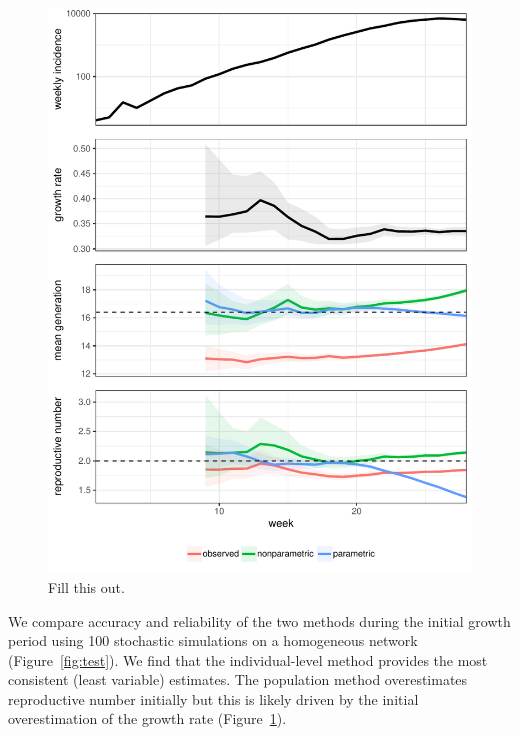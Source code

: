 \documentclass[12pt]{article}
\begin{document}
\begin{figure}
\includegraphics[width=\textwidth]{../fig/example.pdf}
\caption{Fill this out.}
\label{fig:example}
\end{figure}

We compare accuracy and reliability of the two methods during the initial growth period using 100 stochastic simulations on a homogeneous network (Figure~\ref{fig:test}).
We find that the individual-level method provides the most consistent (least variable) estimates.
The population method overestimates reproductive number initially but this is likely driven by the initial overestimation of the growth rate (Figure~\ref{fig:example}).
\end{document}
